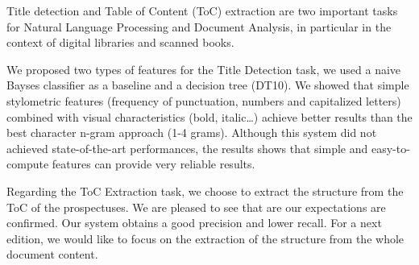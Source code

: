 Title detection and Table of Content (ToC) extraction are two important tasks for Natural Language Processing and Document Analysis, in particular in the context of digital libraries and scanned books.

We proposed two types of features for the Title Detection task, we used a naive Bayses classifier as a baseline and a decision tree (DT10). We showed that simple stylometric features (frequency of punctuation, numbers and capitalized letters) combined with visual characteristics  (bold, italic\dots) achieve better results than the best character n-gram approach (1-4 grams).
Although this system did not achieved state-of-the-art performances, the results shows that simple and easy-to-compute features can provide very reliable results.

Regarding the ToC Extraction task, we choose to extract the structure from
the ToC of the prospectuses.  We are pleased to see that are our
expectations are confirmed.  Our system obtains a good precision and
lower recall. For a next edition, we would like to focus on the extraction
of the structure from the whole document content.
